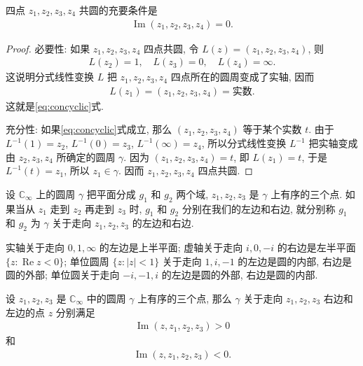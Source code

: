 \documentclass[../../main.tex]{subfiles}%
\begin{document}
\begin{proposition}
四点 $z_1,z_2,z_3,z_4$ 共圆的充要条件是
\begin{align}
\operatorname{Im}(z_1,z_2,z_3,z_4) = 0. \label{eq:concyclic}
\end{align}
\end{proposition}
\begin{proof}

{\heiti 必要性:} 如果 $z_1,z_2,z_3,z_4$ 四点共圆, 令 $L(z) = (z_1,z_2,z_3,z_4)$, 则
\begin{align*}
L(z_2) = 1, \quad L(z_3) = 0, \quad L(z_4) = \infty.
\end{align*}
这说明分式线性变换 $L$ 把 $z_1,z_2,z_3,z_4$ 四点所在的圆周变成了实轴, 因而
\begin{align*}
L(z_1) = (z_1,z_2,z_3,z_4) = \text{实数}.
\end{align*}
这就是\eqref{eq:concyclic}式.

{\heiti 充分性:} 如果\eqref{eq:concyclic}式成立, 那么 $(z_1,z_2,z_3,z_4)$ 等于某个实数 $t$. 由于 $L^{-1}(1) = z_2$, $L^{-1}(0) = z_3$, $L^{-1}(\infty) = z_4$, 所以分式线性变换 $L^{-1}$ 把实轴变成由 $z_2,z_3,z_4$ 所确定的圆周 $\gamma$. 因为 $(z_1,z_2,z_3,z_4) = t$, 即 $L(z_1) = t$, 于是 $L^{-1}(t) = z_1$, 所以 $z_1 \in \gamma$. 因而 $z_1,z_2,z_3,z_4$ 四点共圆.
\end{proof}

\begin{definition}
设 $\mathbb{C}_\infty$ 上的圆周 $\gamma$ 把平面分成 $g_1$ 和 $g_2$ 两个域, $z_1,z_2,z_3$ 是 $\gamma$ 上有序的三个点. 如果当从 $z_1$ 走到 $z_2$ 再走到 $z_3$ 时, $g_1$ 和 $g_2$ 分别在我们的左边和右边, 就分别称 $g_1$ 和 $g_2$ 为 $\gamma$ 关于走向 $z_1,z_2,z_3$ 的左边和右边.
\end{definition}

\begin{example}
实轴关于走向 $0,1,\infty$ 的左边是上半平面; 虚轴关于走向 $i,0,-i$ 的右边是左半平面 $\{z: \operatorname{Re} z < 0\}$; 单位圆周 $\{z: |z| < 1\}$ 关于走向 $1,i,-1$ 的左边是圆的内部, 右边是圆的外部; 单位圆关于走向 $-i,-1,i$ 的左边是圆的外部, 右边是圆的内部.
\end{example}

\begin{proposition}
设 $z_1,z_2,z_3$ 是 $\mathbb{C}_\infty$ 中的圆周 $\gamma$ 上有序的三个点, 那么 $\gamma$ 关于走向 $z_1,z_2,z_3$ 右边和左边的点 $z$ 分别满足
\begin{align*}
\operatorname{Im}(z,z_1,z_2,z_3) > 0
\end{align*}
和
\begin{align*}
\operatorname{Im}(z,z_1,z_2,z_3) < 0.
\end{align*}
\end{proposition}
\end{document}
